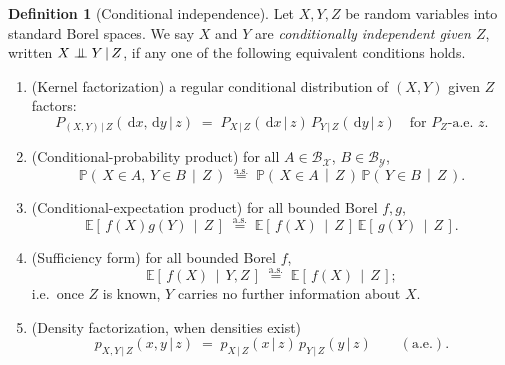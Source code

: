 \documentclass[11pt,oneside]{report}
\theoremstyle{plain}
\theoremstyle{definition}
\newtheorem{definition}[theorem]{Definition}
\theoremstyle{remark}
\newcommand{\Prob}{\mathbb{P}}
\newcommand{\E}{\mathbb{E}}
\newcommand{\dd}{\,\mathrm{d}}
\newcommand{\Bcal}{\mathcal{B}}
\newcommand{\Xcal}{\mathcal{X}}
\newcommand{\Ycal}{\mathcal{Y}}
\newcommand{\eqas}{\overset{\text{a.s.}}{=}}
\newcommand{\given}{\,\vert\,}
\newcommand{\indep}{\mathrel{\perp\mkern-10mu\perp}}
\newcommand{\cE}[2]{\E\!\left[\,#1 \,\middle|\, #2\,\right]}
\newcommand{\cProb}[2]{\Prob\!\left(\,#1 \,\middle|\, #2\,\right)}
\numberwithin{equation}{chapter}
\begin{document}
\begin{definition}[Conditional independence]\label{def:ci}
Let $X,Y,Z$ be random variables into standard Borel spaces. We say $X$ and
$Y$ are \emph{conditionally independent given $Z$}, written
$X\indep Y\given Z$, if any one of the following equivalent conditions
holds.
\begin{enumerate}[label=\textup{(CI\arabic*)},leftmargin=3.4em]
\item \textup{(Kernel factorization)} a regular conditional distribution of
      $(X,Y)$ given $Z$ factors:
      \begin{equation}\label{eq:ci-kernel}
        P_{(X,Y)\given Z}(\dd x,\dd y\given z)
        \;=\;P_{X\given Z}(\dd x\given z)\,P_{Y\given Z}(\dd y\given z)
        \quad\text{for }P_Z\text{-a.e.\ }z.
      \end{equation}
\item \textup{(Conditional-probability product)} for all
      $A\in\Bcal_\Xcal$, $B\in\Bcal_\Ycal$,
      \begin{equation}\label{eq:ci-prob}
        \cProb{X\in A,\,Y\in B}{Z}\;\eqas\;
        \cProb{X\in A}{Z}\,\cProb{Y\in B}{Z}.
      \end{equation}
\item \textup{(Conditional-expectation product)} for all bounded Borel
      $f,g$,
      \begin{equation}\label{eq:ci-exp}
        \cE{f(X)g(Y)}{Z}\;\eqas\;\cE{f(X)}{Z}\,\cE{g(Y)}{Z}.
      \end{equation}
\item \textup{(Sufficiency form)} for all bounded Borel $f$,
      \begin{equation}\label{eq:ci-suff}
        \cE{f(X)}{Y,Z}\;\eqas\;\cE{f(X)}{Z};
      \end{equation}
      i.e.\ once $Z$ is known, $Y$ carries no further information about $X$.
\item \textup{(Density factorization, when densities exist)}
      \begin{equation}\label{eq:ci-density}
        p_{X,Y\given Z}(x,y\given z)\;=\;p_{X\given Z}(x\given z)\,
        p_{Y\given Z}(y\given z)\qquad(\text{a.e.}).
      \end{equation}
\end{enumerate}
\end{definition}
\end{document}
